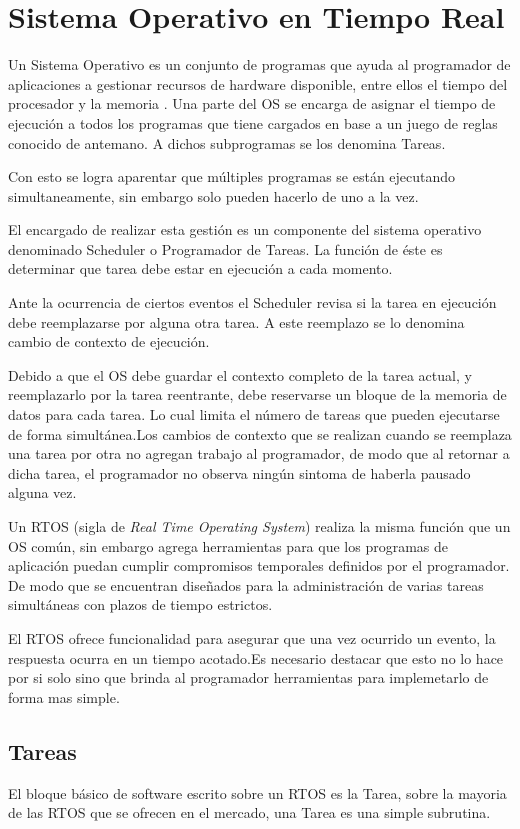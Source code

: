 \documentclass[12pt,letterpaper]{article}
\begin{document}
\section{Sistema Operativo en Tiempo Real}
Un Sistema Operativo es un conjunto de programas que ayuda al programador de aplicaciones a gestionar recursos de hardware disponible, entre ellos el tiempo del procesador y la memoria \cite{sase2011}.
Una parte del OS se encarga de asignar el tiempo de ejecución a todos los programas que tiene cargados en base a un juego de reglas conocido de antemano. A dichos subprogramas se los denomina Tareas.

Con esto se logra aparentar que múltiples programas se están ejecutando simultaneamente, sin embargo solo pueden hacerlo de uno a la vez.

El encargado de realizar esta gestión es un componente del sistema operativo denominado Scheduler o Programador de Tareas. La función de éste es determinar que tarea debe estar en ejecución a cada momento.

Ante la ocurrencia de ciertos eventos el Scheduler revisa si la tarea en ejecución debe reemplazarse por alguna otra tarea. A este reemplazo se lo denomina cambio de contexto de ejecución.

Debido a que el OS debe guardar el contexto completo de la tarea actual, y reemplazarlo por la tarea reentrante, debe reservarse un bloque de la memoria de datos para cada tarea. Lo cual limita el número de tareas que pueden ejecutarse de forma simultánea.Los cambios de contexto que se realizan cuando se reemplaza una tarea por otra no agregan trabajo al programador, de modo que al retornar a dicha tarea, el programador no observa ningún sintoma de haberla pausado alguna vez.

Un RTOS (sigla de \textit{Real Time Operating System}) realiza la misma función que un OS común, sin embargo agrega herramientas para que los programas de aplicación puedan cumplir compromisos temporales definidos por el programador. De modo que se encuentran diseñados para la administración de varias tareas simultáneas con plazos de tiempo estrictos.

El RTOS ofrece funcionalidad para asegurar que una vez ocurrido un evento, la respuesta ocurra en un tiempo acotado.Es necesario destacar que esto no lo hace por si solo sino que brinda al programador herramientas para implemetarlo de forma mas simple.

\subsection{Tareas}\label{sec:tareas}
El bloque básico de software escrito sobre un RTOS es la Tarea, sobre la mayoria de las RTOS que se ofrecen en el mercado, una Tarea es una simple subrutina\cite{librodertoseningles}.
\end{document}
